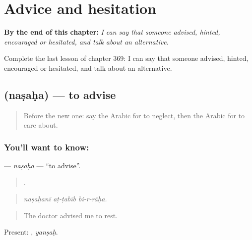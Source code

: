
\chapter{Advice and hesitation}
\label{ch:ar-advice-and-hesitation}

\begin{chapteropening}
\textbf{By the end of this chapter:} \emph{I can say that someone advised, hinted, encouraged or hesitated, and talk about an alternative.}

Complete the last lesson of chapter 369: I can say that someone advised, hinted, encouraged or hesitated, and talk about an alternative.
\end{chapteropening}

\section[\texorpdfstring{\ar{نصح} (naṣaḥa)}{نصح (naṣaḥa)}]{ (naṣaḥa) — to advise}

\label{lesson:AR-C369-nasaha}



\begin{quote}
Before the new one: say the Arabic for to neglect, then the Arabic for to care about.
\end{quote}

\subsection*{You'll want to know: }
\textbf{} — \emph{naṣaḥa} — \textquotedblleft{}to advise\textquotedblright{}.

\begin{quote}
  .
\end{quote}

\begin{quote}
\emph{naṣaḥanī aṭ-ṭabīb bi-r-rāḥa.}
\end{quote}

\begin{quote}
The doctor advised me to rest.
\end{quote}

Present: , \emph{yanṣaḥ}.

